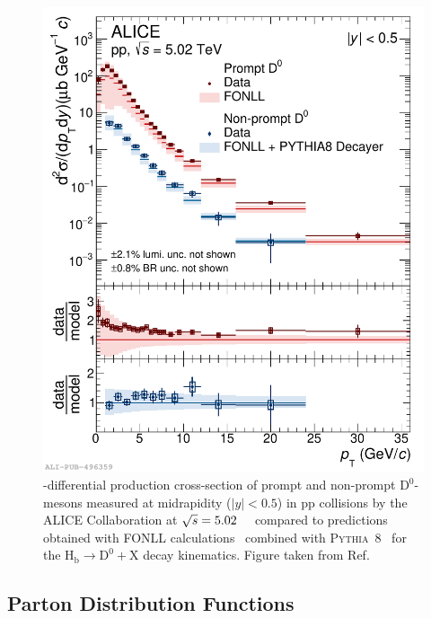 \begin{figure}[htb]
    \centering
    \includegraphics[width=0.6\linewidth]{Figures/Chapter 2/CrossSectionD0_Prompt_NonPrompt_pp5TeV_vsFONLL_Pythia8_BRnative_1.pdf}
    \caption{\pt-differential production cross-section of prompt and non-prompt $\mathrm{D^0}$-mesons measured at midrapidity ($\lvert y\rvert<0.5$) in pp collisions by the ALICE Collaboration at $\sqrt{s}=5.02$~\tev~\cite{ALICE:2021mgk} compared to predictions obtained with FONLL calculations~\cite{Cacciari:1998it} combined with \textsc{Pythia}~8~\cite{Sjostrand:2014zea} for the $\mathrm{H_b \rightarrow D^0+X}$ decay kinematics. Figure taken from Ref.~\cite{ALICE:2021mgk}}
    \label{fig:ppDmeson}
\end{figure}

\subsection{Parton Distribution Functions}
